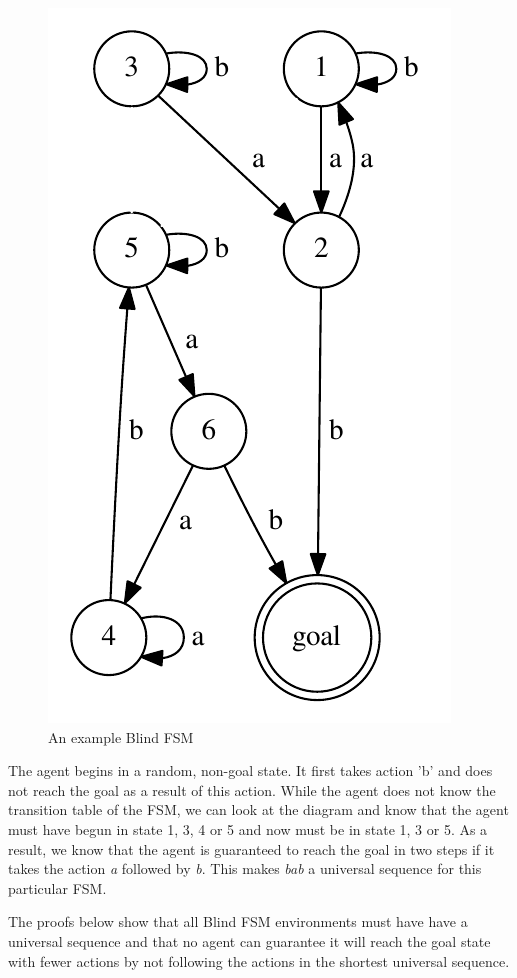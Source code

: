 \documentclass[letterpaper]{article} %
\begin{document}
\begin{figure}[t]
\centering
\includegraphics[width=0.6\columnwidth]{ExampleFSM} %
\caption{An example Blind FSM}
\label{fig1}
\end{figure}



The agent begins in a random, non-goal state.  It first takes action
'b' and does not reach the goal as a result of this action.  While the
agent does not know the transition table of the FSM, we can look at
the diagram and know that the agent must have begun in state 1, 3, 4
or 5 and now must be in state 1, 3 or 5.  As a result, we know that
the agent is guaranteed to reach the goal in two steps if it takes the
action \textit{a} followed by \textit{b}.  This makes \textit{bab} a
universal sequence for this particular FSM.

The proofs below show that all Blind FSM environments must have have a
universal sequence and that no agent can guarantee it will reach the
goal state with fewer actions by not following the actions in the
shortest universal sequence.
\end{document}
